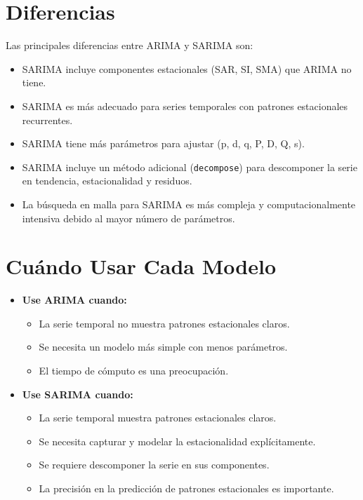 \documentclass[12pt,letterpaper]{report}
\begin{document}
\section{Diferencias}
Las principales diferencias entre ARIMA y SARIMA son:

\begin{itemize}
    \item SARIMA incluye componentes estacionales (SAR, SI, SMA) que ARIMA no tiene.
    \item SARIMA es más adecuado para series temporales con patrones estacionales recurrentes.
    \item SARIMA tiene más parámetros para ajustar (p, d, q, P, D, Q, s).
    \item SARIMA incluye un método adicional (\texttt{decompose}) para descomponer la serie en tendencia, estacionalidad y residuos.
    \item La búsqueda en malla para SARIMA es más compleja y computacionalmente intensiva debido al mayor número de parámetros.
\end{itemize}

\section{Cuándo Usar Cada Modelo}
\begin{itemize}
    \item \textbf{Use ARIMA cuando:}
    \begin{itemize}
        \item La serie temporal no muestra patrones estacionales claros.
        \item Se necesita un modelo más simple con menos parámetros.
        \item El tiempo de cómputo es una preocupación.
    \end{itemize}

    \item \textbf{Use SARIMA cuando:}
    \begin{itemize}
        \item La serie temporal muestra patrones estacionales claros.
        \item Se necesita capturar y modelar la estacionalidad explícitamente.
        \item Se requiere descomponer la serie en sus componentes.
        \item La precisión en la predicción de patrones estacionales es importante.
    \end{itemize}
\end{itemize}
\end{document}

